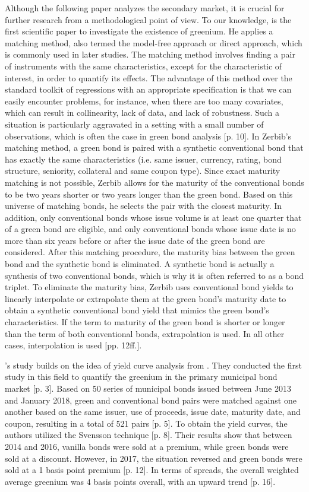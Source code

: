 Although the following paper analyzes the secondary market, it is crucial for further research from a methodological point of view. To our knowledge, \citet{zerbib2017green} is the first scientific paper to investigate the existence of greenium. He applies a matching method, also termed the model-free approach or direct approach, which is commonly used in later studies. The matching method involves finding a pair of instruments with the same characteristics, except for the characteristic of interest, in order to quantify its effects. The advantage of this method over the standard toolkit of regressions with an appropriate specification is that we can easily encounter problems, for instance, when there are too many covariates, which can result in collinearity, lack of data, and lack of robustness. Such a situation is particularly aggravated in a setting with a small number of observations, which is often the case in green bond analysis [p. 10]. In Zerbib's matching method, a green bond is paired with a synthetic conventional bond that has exactly the same characteristics (i.e. same issuer, currency, rating, bond structure, seniority, collateral and same coupon type). Since exact maturity matching is not possible, Zerbib allows for the maturity of the conventional bonds to be two years shorter or two years longer than the green bond. Based on this universe of matching bonds, he selects the pair with the closest maturity. In addition, only conventional bonds whose issue volume is at least one quarter that of a green bond are eligible, and only conventional bonds whose issue date is no more than six years before or after the issue date of the green bond are considered. After this matching procedure, the maturity bias between the green bond and the synthetic bond is eliminated. A synthetic bond is actually a synthesis of two conventional bonds, which is why it is often referred to as a bond triplet. To eliminate the maturity bias, Zerbib uses conventional bond yields to linearly interpolate or extrapolate them at the green bond's maturity date to obtain a synthetic conventional bond yield that mimics the green bond's characteristics. If the term to maturity of the green bond is shorter or longer than the term of both conventional bonds, extrapolation is used. In all other cases, interpolation is used [pp. 12ff.].

\citet{partridge2018green}'s study builds on the idea of yield curve analysis from \citet{cbi2017}. They conducted the first study in this field to quantify the greenium in the primary municipal bond market [p. 3]. Based on 50 series of municipal bonds issued between June 2013 and January 2018, green and conventional bond pairs were matched against one another based on the same issuer, use of proceeds, issue date, maturity date, and coupon, resulting in a total of 521 pairs [p. 5]. To obtain the yield curves, the authors utilized the Svensson technique [p. 8]. Their results show that between 2014 and 2016, vanilla bonds were sold at a premium, while green bonds were sold at a discount. However, in 2017, the situation reversed and green bonds were sold at a 1 basis point premium [p. 12]. In terms of spreads, the overall weighted average greenium was 4 basis points overall, with an upward trend [p. 16].

